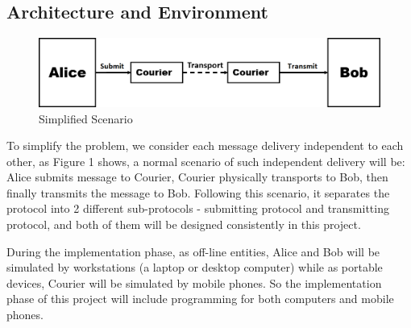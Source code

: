\documentclass[11pt,a4paper]{article}
\begin{document}
\subsection{Architecture and Environment}
\begin{figure}[h!]
\includegraphics[width=\textwidth,natwidth=1263,natheight=256]{flowchart.png}
\caption{Simplified Scenario}
\end{figure}
To simplify the problem, we consider each message delivery independent to each other, as Figure 1 shows, a normal scenario of such independent delivery will be: Alice submits message to Courier, Courier physically transports to Bob, then finally transmits the message to Bob. Following this scenario, it separates the protocol into 2 different sub-protocols - submitting protocol and transmitting protocol, and both of them will be designed consistently in this project.\par
During the implementation phase, as off-line entities, Alice and Bob will be simulated by workstations (a laptop or desktop computer) while as portable devices, Courier will be simulated by mobile phones. So the implementation phase of this project will include programming for both computers and mobile phones.
\end{document}

